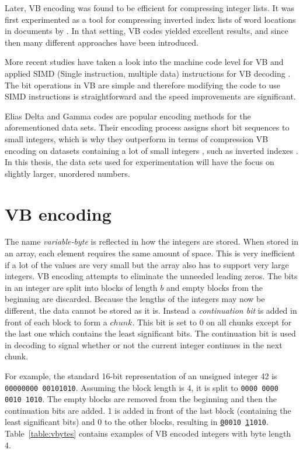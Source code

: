 Later, VB encoding was found to be efficient for compressing integer lists. It was first experimented as a tool for compressing inverted index lists of word locations in documents by \citep{Sch02}. 
In that setting, VB codes yielded excellent results, and since then many different approaches have been introduced. 

More recent studies have taken a look into the machine code level for VB and applied SIMD (Single instruction, multiple data) instructions for VB decoding \citep{Lem18,Pla15}. The bit 
operations in VB are simple and therefore modifying the code to use SIMD instructions is straightforward and the speed improvements are significant. 

Elias Delta and Gamma codes \citep{Eli75} are popular encoding methods for the aforementioned data sets. Their encoding process assigns short bit sequences to small integers, 
which is why they outperform in terms of compression VB encoding on datasets containing a lot of small integers \citep{Wil99}, such as inverted indexes \citep{Anh05, Pib19}. In this thesis, 
the data sets used for experimentation will have the focus on slightly larger, unordered numbers.

\section{VB encoding}
The name \textit{variable-byte} is reflected in how the integers are stored. When stored in an array, each element requires the same amount of space. This is very inefficient if a lot of the values are 
very small but the array also has to support very large integers. VB encoding attempts to eliminate the unneeded leading zeros. The bits in an integer are split into blocks of length $b$ and empty blocks 
from the beginning are discarded. Because the lengths of the integers may now be different, the data cannot be stored as it is. Instead a \textit{continuation bit} is added in front of each block to form 
a $chunk$. This bit is set to 0 on all chunks except for the last one which contains the least significant bits. The continuation bit is used in decoding to signal whether or not the current integer 
continues in the next chunk.

For example, the standard 16-bit representation of an unsigned integer 42 is \texttt{00000000 00101010}. Assuming the block length is 4, it is split to \texttt{0000 0000 0010 1010}. The empty blocks 
are removed from the beginning and then the continuation bits are added. 1 is added in front of the last block (containing the least significant bits) and 0 to the other blocks, resulting in 
\texttt{\underline{0}0010 \underline{1}1010}. Table~\ref{table:vbytes} contains examples of VB encoded integers with byte length 4. 

